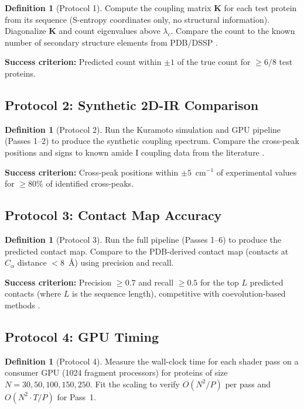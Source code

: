 \documentclass[11pt,twocolumn,a4paper]{article}
\theoremstyle{definition}
\newtheorem{definition}[theorem]{Definition}
\theoremstyle{remark}
\newcommand{\coupmat}{\mathbf{K}}
\begin{document}
\begin{definition}[Protocol 1]
Compute the coupling matrix $\coupmat$ for each test protein from its sequence (S-entropy coordinates only, no structural information). Diagonalize $\coupmat$ and count eigenvalues above $\lambda_c$. Compare the count to the known number of secondary structure elements from PDB/DSSP \citep{berman2000}.
\end{definition}

\textbf{Success criterion:} Predicted count within $\pm 1$ of the true count for $\geq 6/8$ test proteins.

\subsection{Protocol 2: Synthetic 2D-IR Comparison}

\begin{definition}[Protocol 2]
Run the Kuramoto simulation and GPU pipeline (Passes 1--2) to produce the synthetic coupling spectrum. Compare the cross-peak positions and signs to known amide I coupling data from the literature \citep{ganim2008, hamm1998, torii1992}.
\end{definition}

\textbf{Success criterion:} Cross-peak positions within $\pm 5$~cm$^{-1}$ of experimental values for $\geq 80\%$ of identified cross-peaks.

\subsection{Protocol 3: Contact Map Accuracy}

\begin{definition}[Protocol 3]
Run the full pipeline (Passes 1--6) to produce the predicted contact map. Compare to the PDB-derived contact map (contacts at $C_\alpha$ distance $< 8$~\AA) using precision and recall.
\end{definition}

\textbf{Success criterion:} Precision $\geq 0.7$ and recall $\geq 0.5$ for the top $L$ predicted contacts (where $L$ is the sequence length), competitive with coevolution-based methods \citep{marks2011, gobel1994}.

\subsection{Protocol 4: GPU Timing}

\begin{definition}[Protocol 4]
Measure the wall-clock time for each shader pass on a consumer GPU (1024 fragment processors) for proteins of size $N = 30, 50, 100, 150, 250$. Fit the scaling to verify $O(N^2/P)$ per pass and $O(N^2 \cdot T/P)$ for Pass~1.
\end{definition}
\end{document}
